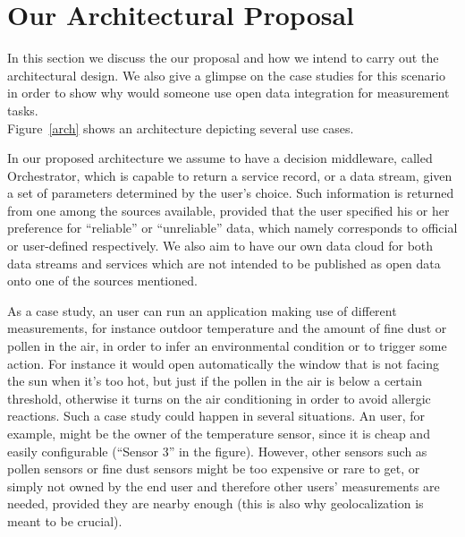 \section{Our Architectural Proposal}
\label{sec:casestudy}
In this section we discuss the our proposal and how we intend to carry out the architectural design.
We also give a glimpse on the case studies for this scenario in order to show why would someone use open data integration for measurement tasks.
\\
Figure~\ref{arch} shows an architecture depicting several use cases.

In our proposed architecture we assume to have a decision middleware, called Orchestrator, which is capable to return a service record, or a data stream, given a set of parameters determined by the user's choice.
Such information is returned from one among the sources available, provided that the user specified his or her preference for ``reliable'' or ``unreliable'' data, which namely corresponds to official or user-defined respectively.
We also aim to have our own data cloud for both data streams and services which are not intended to be published as open data onto one of the sources mentioned.

As a case study, an user can run an application making use of different measurements, for instance outdoor temperature and the amount of fine dust or pollen in the air, in order to infer an environmental condition or to trigger some action.
For instance it would open automatically the window that is not facing the sun when it's too hot, but just if the pollen in the air is below a certain threshold, otherwise it turns on the air conditioning in order to avoid allergic reactions.
Such a case study could happen in several situations.
An user, for example, might be the owner of the temperature sensor, since it is cheap and easily configurable (``Sensor 3'' in the figure).
However, other sensors such as pollen sensors or fine dust sensors might be too expensive or rare to get, or simply not owned by the end user and therefore other users' measurements are needed, provided they are nearby enough (this is also why geolocalization is meant to be crucial).

